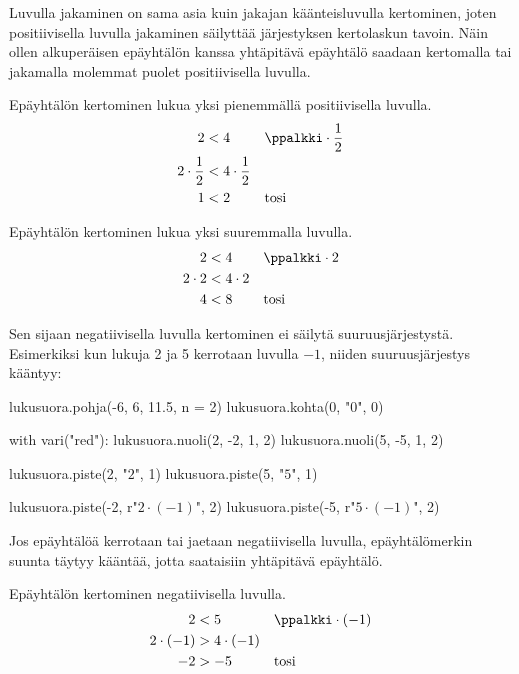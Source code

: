 Luvulla jakaminen on sama asia kuin jakajan käänteisluvulla kertominen, joten positiivisella luvulla jakaminen säilyttää järjestyksen kertolaskun tavoin. Näin ollen alkuperäisen epäyhtälön kanssa yhtäpitävä epäyhtälö saadaan kertomalla tai jakamalla molemmat puolet positiivisella luvulla.

\begin{esimerkki}
Epäyhtälön kertominen lukua yksi pienemmällä positiivisella luvulla.
\begin{align*}
     2 &< 4 && \ppalkki \cdot \frac{1}{2} \\
   2\cdot\frac{1}{2} &< 4\cdot\frac{1}{2}  \\
     1 &< 2 && \textrm{tosi}
\end{align*}
\end{esimerkki}

\begin{esimerkki}
Epäyhtälön kertominen lukua yksi suuremmalla luvulla.
\begin{align*}
     2 &< 4 && \ppalkki \cdot 2 \\
   2\cdot 2 &< 4\cdot 2  \\
     4 &< 8 && \textrm{tosi}
\end{align*}
\end{esimerkki}

Sen sijaan negatiivisella luvulla kertominen ei säilytä suuruusjärjestystä. Esimerkiksi kun lukuja 2 ja 5 kerrotaan luvulla $-1$, niiden suuruusjärjestys kääntyy:

\begin{kuva}
lukusuora.pohja(-6, 6, 11.5, n = 2)
lukusuora.kohta(0, "$0$", 0)

with vari("red"):
	lukusuora.nuoli(2, -2, 1, 2)
	lukusuora.nuoli(5, -5, 1, 2)

lukusuora.piste(2, "$2$", 1)
lukusuora.piste(5, "$5$", 1)

lukusuora.piste(-2, r"$2 \cdot (-1)$", 2)
lukusuora.piste(-5, r"$5 \cdot (-1)$", 2)
\end{kuva}

Jos epäyhtälöä kerrotaan tai jaetaan negatiivisella luvulla, epäyhtälömerkin suunta täytyy kääntää, jotta saataisiin yhtäpitävä epäyhtälö.

\begin{esimerkki}
Epäyhtälön kertominen negatiivisella luvulla.
\begin{align*}
     2 &< 5 && \ppalkki \cdot (-1) \\
   2\cdot (-1) &> 4\cdot (-1)  \\
     -2 &> -5 && \textrm{tosi}
\end{align*}
\end{esimerkki}

